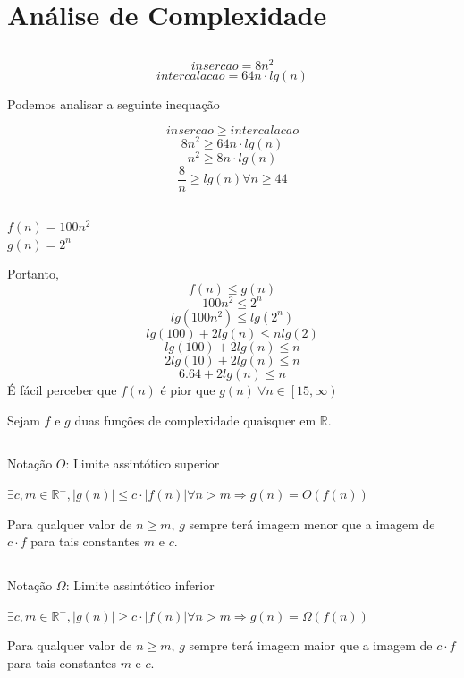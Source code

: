 \section{Análise de Complexidade}
\subsection{}
$$insercao = 8n^2$$
$$intercalacao = 64n\cdot lg(n)$$

Podemos analisar a seguinte inequação

$$insercao \geq intercalacao $$
$$8n^2 \geq 64n\cdot lg(n)$$
$$n^2 \geq 8n\cdot lg(n)$$
$$\frac{8}{n}   \geq lg(n)  \forall n \geq 44$$


\subsection{}

$f(n) = 100n^2$ \\
$g(n) = 2^n$

Portanto, 
$$ f(n) \leq g(n) $$ 
$$ 100n^2 \leq 2^n$$ 
$$lg(100n^2) \leq lg(2^n)$$
$$lg(100)+2lg(n) \leq n lg(2)$$
$$lg(100)+2lg(n) \leq n$$
$$2lg(10) + 2lg(n) \leq n$$
$$6.64 + 2lg(n) \leq n$$
É fácil perceber  que $f(n)$ é pior que $g(n) \ \forall n \in \left[ 15, \infty \right)  $ \\



\begin{flushleft}
	Sejam $f$ e $g$ duas funções de complexidade quaisquer em $\mathbb{R}$.
\end{flushleft}
\subsection{}
\begin{definition}
	Notação $O$: Limite assintótico superior
	
	$\exists c, m \in \mathbb{R^+}, |g(n)| \leq c \cdot |f(n)| \forall n>m \Rightarrow g(n) = O(f(n))$
\end{definition}
Para qualquer valor de $n \geq m$, $g$ sempre terá imagem menor que a imagem de $c \cdot f$ para tais constantes $m$ e $c$.

\subsection{}

\begin{definition}
	Notação $\Omega$: Limite assintótico inferior
	
	$\exists c, m \in \mathbb{R^+}, |g(n)| \geq c \cdot |f(n)| \forall n>m \Rightarrow g(n) = \Omega(f(n))$
\end{definition}
Para qualquer valor de $n \geq m$, $g$ sempre terá imagem maior que a imagem de $c \cdot f$ para tais constantes $m$ e $c$.

